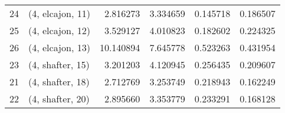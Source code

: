 \begin{tabular}{llrrrr}
24 &  (4, elcajon, 11) &   2.816273 &   3.334659 &   0.145718 &  0.186507 \\
25 &  (4, elcajon, 12) &   3.529127 &   4.010823 &   0.182602 &  0.224325 \\
26 &  (4, elcajon, 13) &  10.140894 &   7.645778 &   0.523263 &  0.431954 \\
23 &  (4, shafter, 15) &   3.201203 &   4.120945 &   0.256435 &  0.209607 \\
21 &  (4, shafter, 18) &   2.712769 &   3.253749 &   0.218943 &  0.162249 \\
22 &  (4, shafter, 20) &   2.895660 &   3.353779 &   0.233291 &  0.168128 \\
\bottomrule
\end{tabular}
